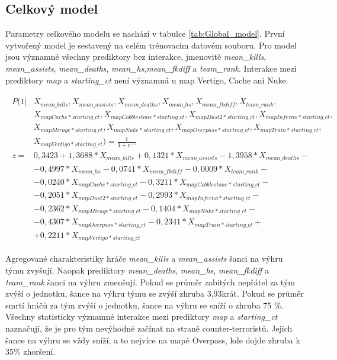 \subsection{Celkový model}



Parametry celkového modelu se nachází v tabulce \ref{tab:Global_model}. První vytvořený model je sestavený na celém trénovacím datovém souboru. Pro model jsou
významné všechny prediktory bez interakce, jmenovitě \textit{mean\_kills}, \textit{mean\_assists}, \textit{mean\_deaths}, \textit{mean\_hs},\textit{mean\_fkdiff} a
\textit{team\_rank}. Interakce mezi prediktory \textit{map} a \textit{starting\_ct} není významná u map Vertigo, Cache ani Nuke.

\begin{align}
    \begin{split}
        P(1 | &X_{mean\_kills}, X_{mean\_assists}, X_{mean\_deaths}, X_{mean\_hs}, X_{mean\_fkdiff}, X_{team\_rank}, \\
              &X_{mapCache*starting\_ct}, X_{mapCobblestone*starting\_ct}, X_{mapDust2*starting\_ct}, X_{mapInferno*starting\_ct}, \\
              &X_{mapMirage*starting\_ct}, X_{mapNuke*starting\_ct}, X_{mapOverpass*starting\_ct}, X_{mapTrain*starting\_ct}, \\
              &X_{mapVertigo*starting\_ct}) = \frac{1}{1 + e^{-z}} \\
        z = &  0,3423 + 1,3688*X_{mean\_kills} + 0,1321*X_{mean\_assists} - 1,3958*X_{mean\_deaths} - \\
            &- 0,4997*X_{mean\_hs} - 0,0741*X_{mean\_fkdiff} - 0,0009*X_{team\_rank} - \\
            &- 0,0240*X_{mapCache*starting\_ct} - 0,3211*X_{mapCobblestone*starting\_ct} - \\
            &- 0,2051*X_{mapDust2*starting\_ct} - 0,2993*X_{mapInferno*starting\_ct} - \\
            &- 0,2362*X_{mapMirage*starting\_ct} - 0,1404*X_{mapNuke*starting\_ct} - \\
            &- 0,4307*X_{mapOverpass*starting\_ct} - 0,2341*X_{mapTrain*starting\_ct} + \\
            &+ 0,2211*X_{mapVertigo*starting\_ct}
    \end{split}
\end{align}

Agregované charakteristiky hráče \textit{mean\_kills} a \textit{mean\_assists} šanci na výhru týmu zvyšují. Naopak prediktory \textit{mean\_deaths}, \textit{mean\_hs}, 
\textit{mean\_fkdiff} a \textit{team\_rank} šanci na výhru zmenšují. Pokud se průměr zabitých nepřátel za tým zvýší o jednotku,
šance na výhru týmu se zvýší zhruba 3,93krát. Pokud se průměr smrtí hráčů za tým zvýší o jednotku, šance na výhru se sníží o zhruba 75 \%. Všechny statisticky
významné interakce mezi prediktory \textit{map} a \textit{starting\_ct} naznačují, že je pro tým nevýhodné začínat na straně counter-terroristů. Jejich šance
na výhru se vždy sníží, a to nejvíce na mapě Overpass, kde dojde zhruba k 35\% zhoršení.

